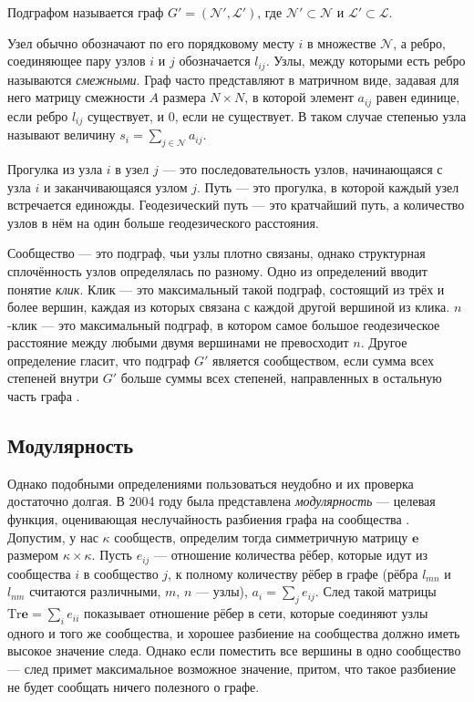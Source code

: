 \documentclass{matmex-diploma}
\begin{document}
Подграфом называется граф $G' = (\mathscr{N}', \mathscr{L}')$, где $\mathscr{N}' \subset \mathscr{N}$ и $\mathscr{L}' \subset \mathscr{L}$.

Узел обычно обозначают по его порядковому месту $i$ в множестве $\mathscr{N}$, а ребро, соединяющее пару узлов $i$ и $j$ обозначается $l_{ij}$. Узлы, между которыми есть ребро называются \emph{смежными}. Граф часто представляют в матричном виде, задавая для него матрицу смежности $A$ размера $N \times N$, в которой элемент $a_{ij}$ равен единице, если ребро $l_{ij}$ существует, и 0, если не существует. В таком случае степенью узла называют величину $s_i = \sum_{j \in \mathscr{N}}a_{ij}$.

Прогулка из узла $i$ в узел $j$ --- это последовательность узлов, начинающаяся с узла $i$ и заканчивающаяся узлом $j$. Путь --- это прогулка, в которой каждый узел встречается единожды. Геодезический путь --- это кратчайший путь, а количество узлов в нём на один больше геодезического расстояния.

Сообщество --- это подграф, чьи узлы плотно связаны, однако структурная сплочённость узлов определялась по разному. Одно из определений вводит понятие \emph{клик}. Клик --- это максимальный такой подграф, состоящий из трёх и более вершин, каждая из которых связана с каждой другой вершиной из клика. $n$-клик --- это максимальный подграф, в котором самое большое геодезическое расстояние между любыми двумя вершинами не превосходит $n$. Другое определение гласит, что подграф $G'$ является сообществом, если сумма всех степеней внутри $G'$ больше суммы всех степеней, направленных в остальную часть графа \cite{Wasserman:1994}.

\subsection{Модулярность}
Однако подобными определениями пользоваться неудобно и их проверка достаточно долгая. В 2004 году была представлена \emph{модулярность} --- целевая функция, оценивающая неслучайность разбиения графа на сообщества \cite{Newman&Girvan:2004}. Допустим, у нас $\kappa$ сообществ, определим тогда симметричную матрицу $\mathbf{e}$ размером $\kappa \times \kappa$. Пусть $e_{ij}$ --- отношение количества рёбер, которые идут из сообщества $i$ в сообщество $j$, к полному количеству рёбер в графе (рёбра $l_{mn}$ и $l_{nm}$ считаются различными, $m$, $n$ --- узлы), $a_i = \sum_j{e_{ij}}$. След такой матрицы $\mathrm{Tr} \mathbf{e} = \sum_i{e_{ii}}$ показывает отношение рёбер в сети, которые соединяют узлы одного и того же сообщества, и хорошее разбиение на сообщества должно иметь высокое значение следа. Однако если поместить все вершины в одно сообщество --- след примет максимальное возможное значение, притом, что такое разбиение не будет сообщать ничего полезного о графе.
\end{document}
